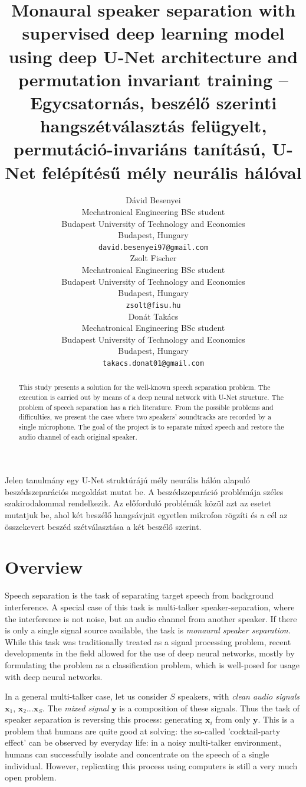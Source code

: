 \documentclass{article}
\title{Monaural speaker separation with supervised deep learning model using deep U-Net architecture and permutation invariant training -- Egycsatornás, beszélő szerinti hangszétválasztás felügyelt, permutáció-invariáns tanítású, U-Net felépítésű mély neurális hálóval}
\author{
  Dávid Besenyei \\
  Mechatronical Engineering BSc student\\
  Budapest University of Technology and Economics\\
  Budapest, Hungary \\
  \texttt{david.besenyei97@gmail.com} \\
  \And
  Zsolt Fischer \\
  Mechatronical Engineering BSc student\\
  Budapest University of Technology and Economics\\
  Budapest, Hungary \\
  \texttt{zsolt@fisu.hu} \\
  \And
  Donát Takács \\
  Mechatronical Engineering BSc student\\
  Budapest University of Technology and Economics\\
  Budapest, Hungary \\
  \texttt{takacs.donat01@gmail.com} \\
}
\newcommand{\mx}[1]{\mathbf{\bm{#1}}}
\begin{document}

\maketitle

\begin{abstract}
This study presents a solution for the well-known speech separation problem. The execution is carried out by means of a deep neural network with U-Net structure. The problem of speech separation has a  rich literature. From the possible problems and difficulties, we present the case where two speakers' soundtracks are recorded by a single microphone. The goal of the project is to separate mixed speech and restore the audio channel of each original speaker.
\end{abstract}

\begin{abstracthu}
Jelen tanulmány egy U-Net struktúrájú mély neurális hálón alapuló beszédszeparációs megoldást mutat be. A beszédszeparáció problémája széles szakirodalommal rendelkezik. Az előforduló problémák közül azt az esetet mutatjuk be, ahol két beszélő hangsávjait egyetlen mikrofon rögzíti és a cél az összekevert beszéd szétválasztása a két beszélő szerint.
\end{abstracthu}

\section{Overview}

Speech separation is the task of separating
target speech from background interference. A special case of this task is multi-talker speaker-separation, where the interference is not noise, but an audio channel from another speaker. If there is only a single signal source available, the task is \textit{monaural speaker separation}. While this task was traditionally treated as a signal processing problem, recent developments in the field \cite{Wang14} allowed for the use of deep neural networks, mostly by formulating the problem as a classification problem, which is well-posed for usage with deep neural networks.

In a general multi-talker case, let us consider $S$ speakers, with \textit{clean audio signals} $\mx{x}_1,\, \mx{x}_2 ... \mx{x}_S$. The \textit{mixed signal} $\mx{y}$ is a composition of these signals. Thus the task of speaker separation is reversing this process: generating $\mx{x}_i$ from only $\mx{y}$. This is a problem that humans are quite good at solving: the so-called 'cocktail-party effect' can be observed by everyday life: in a noisy multi-talker environment, humans can successfully isolate and concentrate on the speech of a single individual. However, replicating this process using computers is still a very much open problem.
\end{document}
